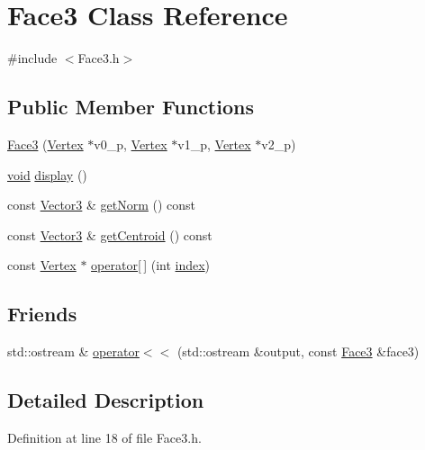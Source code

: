 \hypertarget{class_face3}{\section{Face3 Class Reference}
\label{class_face3}
}


{\ttfamily \#include $<$Face3.\-h$>$}

\subsection*{Public Member Functions}
\begin{DoxyCompactItemize}
\item 
\hyperlink{class_face3_a0f1498f8fdb47eb15d6f5ad9eb355671}{Face3} (\hyperlink{class_vertex}{Vertex} $\ast$v0\-\_\-p, \hyperlink{class_vertex}{Vertex} $\ast$v1\-\_\-p, \hyperlink{class_vertex}{Vertex} $\ast$v2\-\_\-p)
\item 
\hyperlink{glutf90_8h_ac778d6f63f1aaf8ebda0ce6ac821b56e}{void} \hyperlink{class_face3_ad63869f6950c65a327a6c5bc5d742154}{display} ()
\item 
const \hyperlink{class_vector3}{Vector3} \& \hyperlink{class_face3_a30feef340693ff8f5ea1f732f692d33f}{get\-Norm} () const 
\item 
const \hyperlink{class_vector3}{Vector3} \& \hyperlink{class_face3_a2ef3d1aea90175978c0240589959b762}{get\-Centroid} () const 
\item 
const \hyperlink{class_vertex}{Vertex} $\ast$ \hyperlink{class_face3_a7d1d444d697b588fcee74aa79b0f74eb}{operator\mbox{[}$\,$\mbox{]}} (int \hyperlink{gl3_8h_a57f14e05b1900f16a2da82ade47d0c6d}{index})
\end{DoxyCompactItemize}
\subsection*{Friends}
\begin{DoxyCompactItemize}
\item 
std\-::ostream \& \hyperlink{class_face3_adf81375bd8fe97e6b11413afd6295943}{operator$<$$<$} (std\-::ostream \&output, const \hyperlink{class_face3}{Face3} \&face3)
\end{DoxyCompactItemize}


\subsection{Detailed Description}


Definition at line 18 of file Face3.\-h.



